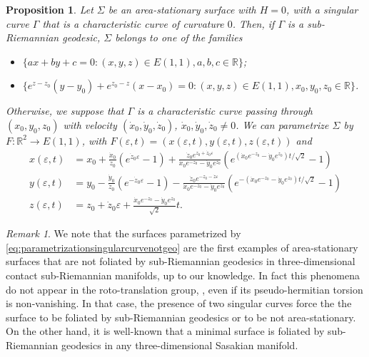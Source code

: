 \documentclass[10pt]{amsart}
\newtheorem{proposition}[theorem]{Proposition}
\theoremstyle{definition}
\theoremstyle{remark}
\newtheorem{remark}[theorem]{Remark}
\numberwithin{equation}{section}
\begin{document}
\begin{proposition} Let ${\Sigma}$ be an area-stationary surface with $H=0$, with a singular curve ${\Gamma}$ that is a characteristic curve of curvature $0$. Then, if ${\Gamma}$ is a sub-Riemannian geodesic, ${\Sigma}$ belongs to one of the families
\begin{itemize}
\item[(i)] $\{ a x+b y+ c=0: (x,y,z)\in{E(1,1)}, a,b,c\in {{\mathbb{R}}}\}$;
\item[(ii)] $\{e^{z-z_0} (y-y_0)+e^{z_0-z}(x-x_0)=0: (x,y,z)\in {E(1,1)}, x_0,y_0,z_0\in {{\mathbb{R}}}\}$.
\end{itemize}
Otherwise, we suppose that ${\Gamma}$ is a characteristic curve passing through $(x_0,y_0,z_0)$ with velocity $(\dot{x}_0,\dot{y}_0,\dot{z}_0)$, $\dot{x}_0,\dot{y}_0,\dot{z}_0\neq 0$. We can parametrize ${\Sigma}$ by $F:{{\mathbb{R}}}^2\rightarrow {E(1,1)}$, with $F({\varepsilon},t)=(x({\varepsilon},t),y({\varepsilon},t),z({\varepsilon},t))$ and 
\begin{equation}\label{eq:parametrizationsingularcurvenotgeo}
\begin{split}
x({\varepsilon},t)&=x_0+\frac{\dot{x}_0}{\dot{z}_0}(e^{\dot{z}_0{\varepsilon}}-1)+\frac{\dot{z}_0e^{z_0+\dot{z}_0{\varepsilon}}}{\dot{x}_0e^{-z_0}-\dot{y}_0e^{z_0}}(e^{(\dot{x}_0e^{-z_0}-\dot{y}_0e^{z_0})t/\sqrt{2}}-1)\\
y({\varepsilon},t)&=y_0-\frac{\dot{y}_0}{\dot{z}_0}(e^{-\dot{z}_0{\varepsilon}}-1)-\frac{\dot{z}_0e^{-z_0-\dot{z}{\varepsilon}}}{\dot{x}_0e^{-z_0}-\dot{y}_0e^{z_0}}(e^{-(\dot{x}_0e^{-z_0}-\dot{y}_0e^{z_0})t/\sqrt{2}}-1)\\
z({\varepsilon},t)&=z_0+\dot{z}_0{\varepsilon}+\frac{\dot{x}_0e^{-z_0}-\dot{y}_0e^{z_0}}{\sqrt{2}}t.
\end{split}
\end{equation}

\end{proposition}

\begin{remark} We note that the surfaces parametrized by \eqref{eq:parametrizationsingularcurvenotgeo} are the first examples of area-stationary surfaces  that are not foliated by sub-Riemannian geodesics in three-dimensional contact sub-Riemannian manifolds, up to our knowledge. In fact this phenomena do not appear in the roto-translation group, \cite[Lemma~10.4]{MR3044134}, even if its pseudo-hermitian torsion is non-vanishing.  In that case, the presence of two singular curves force the the surface to be foliated by sub-Riemannian geodesics or to be not area-stationary. On the other hand, it is well-known that a minimal surface is foliated by sub-Riemannian geodesics in any three-dimensional Sasakian manifold.

\end{remark}
\end{document}

